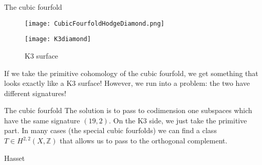 \documentclass[10pt]{beamer}
\begin{document}
\begin{frame}[fragile]{The cubic fourfold}
\begin{figure}
    \centering
    \begin{minipage}{0.45\textwidth}
        \centering
        \texttt{[image: CubicFourfoldHodgeDiamond.png]} %
        \caption*{Cubic fourfold}
    \end{minipage}\hfill
    \begin{minipage}{0.45\textwidth}
        \centering
        \texttt{[image: K3diamond]} %
        \caption*{K3 surface}
    \end{minipage}
\end{figure}\pause

If we take the primitive cohomology of the cubic fourfold, we get something that looks exactly like a K3 surface! However, we run into a problem: the two have different signatures!
\end{frame}

\begin{frame}{The cubic fourfold}
    The solution is to pass to codimension one subspaces which have the same signature $(19,2)$. On the K3 side, we just take the primitive part. In many cases (the special cubic fourfolds) we can find a class $T\in H^{2,2}(X,\mathbb{Z})$ that allows us to pass to the orthogonal complement.

    \begin{colorthm}{Hasset}{}
        
    \end{colorthm}
    
\end{frame}








    
\end{document}
